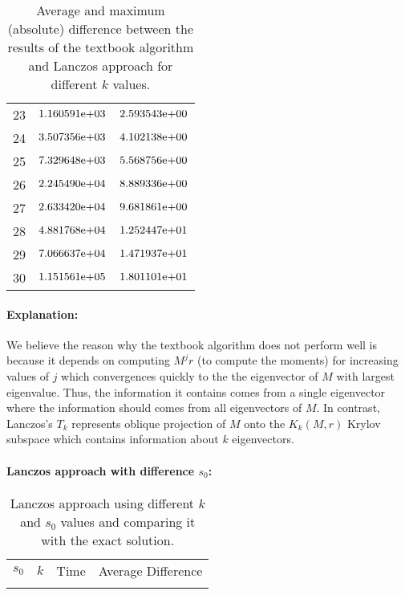 \begin{table}[!tbh]
\begin{tabular}{ |p{1.5cm}| p{4cm}|| p{4cm}|}
	23  & ${1.160591}\mathrm{e}{+03}$   & ${2.593543}\mathrm{e}{+00}$   \\
	24  & ${3.507356}\mathrm{e}{+03}$   & ${4.102138}\mathrm{e}{+00}$   \\
	25  & ${7.329648}\mathrm{e}{+03}$   & ${5.568756}\mathrm{e}{+00}$   \\
	26  & ${2.245490}\mathrm{e}{+04}$   & ${8.889336}\mathrm{e}{+00}$   \\
	27  & ${2.633420}\mathrm{e}{+04}$   & ${9.681861}\mathrm{e}{+00}$   \\
	28  & ${4.881768}\mathrm{e}{+04}$   & ${1.252447}\mathrm{e}{+01}$   \\
	29  & ${7.066637}\mathrm{e}{+04}$   & ${1.471937}\mathrm{e}{+01}$   \\
	30  & ${1.151561}\mathrm{e}{+05}$   & ${1.801101}\mathrm{e}{+01}$   \\
\hline
\end{tabular} 
\caption{Average and maximum (absolute) difference between the results of the textbook algorithm and Lanczos approach for different $k$ values.}
   \label{tab:comp}
\end{table}

\paragraph{Explanation:} We believe the reason why the textbook algorithm does not perform well is because it depends on computing $M^{j}r$ (to compute the moments) for increasing values of $j$ which convergences quickly to the the eigenvector of $M$ with largest eigenvalue. Thus, the information it contains comes from a single eigenvector where the information should comes from all eigenvectors of $M$. In contrast, Lanczos's $T_{k}$ represents oblique projection of $M$ onto the $K_{k}(M,r)$ Krylov subspace which contains information about $k$ eigenvectors. 

\paragraph{Lanczos approach with difference $s_{0}$:}



\begin{table}[!tbh]
 \centering    
\begin{tabular}{ |p{1.5cm}|p{1.5cm}| p{4cm}|| p{4cm}|}
\hline
 $s_{0}$  & $k$ & Time & Average Difference \\ \hhline{|=|=|=|}   
  
\hline
\end{tabular} 
\caption{Lanczos approach using different $k$ and $s_{0}$ values and comparing it with the exact solution. }
   \label{tab:lanczos}
\end{table}